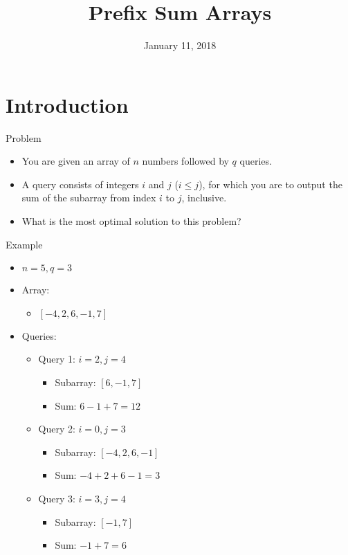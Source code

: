 \documentclass{beamer}
\title[Prefix Sum Arrays---Computer Science Club]{\textbf{Prefix Sum Arrays}}
\institute{Stephen Lewis Secondary School \\[3ex] {\large Computer Science Club}}
\date{January 11, 2018}
\begin{document}
\begin{frame} 
\titlepage 
\end{frame} 

\section{Introduction}

\begin{frame}{Problem}
\begin{itemize}
    \item You are given an array of $n$ numbers followed by $q$ queries.
    \item A query consists of integers $i$ and $j$ ($i \leq j$), for which you are to output the sum of the subarray from index $i$ to $j$, inclusive.
    \item What is the most optimal solution to this problem?
\end{itemize}
\end{frame}

\begin{frame}{Example}
    \begin{itemize}
        \item $n = 5, q = 3$
        \item Array:
        \begin{itemize}
            \item $[-4, 2, 6, -1, 7]$
        \end{itemize}
        
        \item Queries:
        \begin{itemize}
            \item Query 1: $i = 2, j = 4$
            \begin{itemize}
                \item Subarray: $[6, -1, 7]$
                \item Sum: $6 - 1 + 7 = 12$
            \end{itemize}
            
            \item Query 2: $i = 0, j = 3$
            \begin{itemize}
                \item Subarray: $[-4, 2, 6, -1]$
                \item Sum: $-4 + 2 + 6 - 1 = 3$
            \end{itemize}
            
            \item Query 3: $i = 3, j = 4$
            \begin{itemize}
                \item Subarray: $[-1, 7]$
                \item Sum: $-1 + 7 = 6$
            \end{itemize}
        \end{itemize}
    \end{itemize}
\end{frame}
\end{document}
